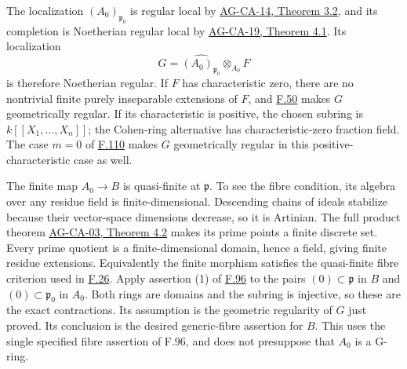 \documentclass[11pt,a4paper,openany]{report}
\begin{document}
The localization \((A_0)_{\mathfrak p_0}\) is regular local by \href{https://github.com/KokunoYumeto/open-math-courses/blob/d02d0a3669f42579db037cd44de1d113fdd770a1/docs/courses/AG-CA/src/regular-local-rings.md}{AG-CA-14, Theorem 3.2}, and its completion is Noetherian regular local by \href{https://github.com/KokunoYumeto/open-math-courses/blob/d02d0a3669f42579db037cd44de1d113fdd770a1/docs/courses/AG-CA/src/completion.md}{AG-CA-19, Theorem 4.1}. Its localization \[G=\widehat{(A_0)_{\mathfrak p_0}}\otimes_{A_0}F\] is therefore Noetherian regular. If \(F\) has characteristic zero, there are no nontrivial finite purely inseparable extensions of \(F\), and \hyperref[AG-RG-S05-algebra-lemma-geometrically-regular]{F.50} makes \(G\) geometrically regular. If its characteristic is positive, the chosen subring is \(k[[X_1,\ldots,X_n]]\); the Cohen-ring alternative has characteristic-zero fraction field. The case \(m=0\) of \hyperref[AG-RG-S05-more-algebra-lemma-helper-G-ring]{F.110} makes \(G\) geometrically regular in this positive-characteristic case as well.

The finite map \(A_0\to B\) is quasi-finite at \(\mathfrak p\). To see the fibre condition, its algebra over any residue field is finite-dimensional. Descending chains of ideals stabilize because their vector-space dimensions decrease, so it is Artinian. The full product theorem \href{https://github.com/KokunoYumeto/open-math-courses/blob/d02d0a3669f42579db037cd44de1d113fdd770a1/docs/courses/AG-CA/src/noetherian-and-artinian-rings.md}{AG-CA-03, Theorem 4.2} makes its prime points a finite discrete set. Every prime quotient is a finite-dimensional domain, hence a field, giving finite residue extensions. Equivalently the finite morphism satisfies the quasi-finite fibre criterion used in \hyperref[AG-RG-S05-algebra-lemma-completion-at-quasi-finite-prime]{F.26}. Apply assertion (1) of \hyperref[AG-RG-S05-more-algebra-lemma-G-ring-goes-up-quasi-finite]{F.96} to the pairs \((0)\subset\mathfrak p\) in \(B\) and \((0)\subset\mathfrak p_0\) in \(A_0\). Both rings are domains and the subring is injective, so these are the exact contractions. Its assumption is the geometric regularity of \(G\) just proved. Its conclusion is the desired generic-fibre assertion for \(B\). This uses the single specified fibre assertion of F.96, and does not presuppose that \(A_0\) is a G-ring.
\end{document}
